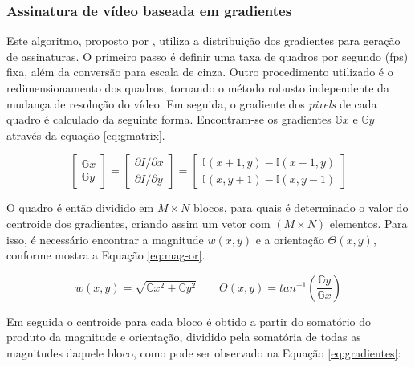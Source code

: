 \subsubsection{Assinatura de vídeo baseada em gradientes}
\label{sec:gradientes}

	Este algoritmo, proposto por \cite{lee2008robust}, utiliza a distribuição dos gradientes para geração de assinaturas. O primeiro passo é definir uma taxa de quadros por segundo (fps) fixa, além da conversão para escala de cinza. Outro procedimento utilizado é o redimensionamento dos quadros, tornando o  método robusto independente da mudança de resolução do vídeo. Em seguida, o gradiente dos \textit{pixels} de cada quadro é calculado da seguinte forma. Encontram-se os gradientes $\mathbb{G}x$ e $\mathbb{G}y$ através da equação \ref{eq:gmatrix}.

\begin{equation}
  \label{eq:gmatrix}
  \begin{bmatrix}
    \mathbb{G}x
    \\ 
    \mathbb{G}y
  \end{bmatrix}= 
  \begin{bmatrix}
    \partial I/\partial x
    \\ 
    \partial I/\partial y
  \end{bmatrix}=
  \begin{bmatrix}
    \mathbb{I}(x+1, y) - \mathbb{I}(x-1,y)
    \\ 
    \mathbb{I}(x, y+1) - \mathbb{I}(x,y-1)
  \end{bmatrix}
\end{equation}
    
	O quadro é então dividido em $M\times N$ blocos, para quais é determinado o valor do centroide dos gradientes, criando assim um vetor com $(M \times N)$ elementos. Para isso, é necessário encontrar a magnitude \textit{$w(x,y)$} e a orientação \textit{$\Theta(x,y)$}, conforme mostra a Equação \ref{eq:mag-or}.
    
\begin{equation}
	\label{eq:mag-or}
    w(x,y) = \sqrt{\mathbb{G}x^{2} + \mathbb{G}y^{2}}
\qquad
\Theta(x,y) = tan^{-1}\left (\frac{\mathbb{G}y}{\mathbb{G}x} \right)
\end{equation}
    
    Em seguida o centroide para cada bloco é obtido a partir do somatório do produto da magnitude e orientação, dividido pela somatória de todas as magnitudes daquele bloco, como pode ser observado na Equação \ref{eq:gradientes}:
    
